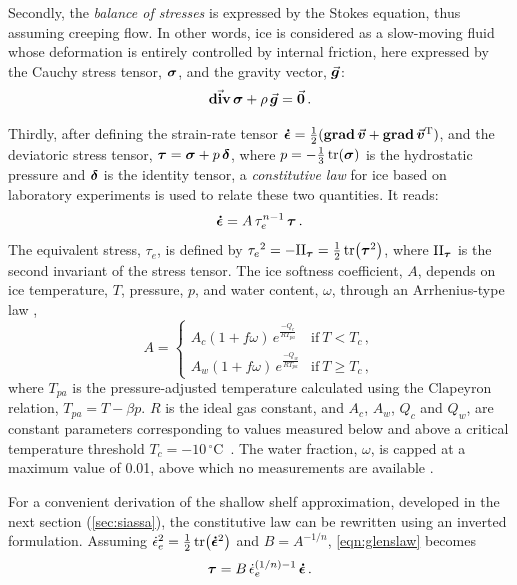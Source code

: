 \documentclass[a4paper]{kappa}
\newcommand{\vect}[1]{\va*{#1}} %
\newcommand{\tens}[1]{\vb*{#1}} %
\newcommand{\tdiv}[1]{\vect{\mathrm{div}}\,#1}      %
\newcommand{\tgrad}[1]{\tens{\mathrm{grad}}\,#1}    %
\newcommand{\doteps}[0]{\dot{\epsilon}} %
\newcommand{\IDT}[0]{\tens{\delta}}     %
\newcommand{\CST}[0]{\tens{\sigma}}     %
\newcommand{\DST}[0]{\tens{\tau}}       %
\newcommand{\SRT}[0]{\tens{\doteps}}    %
\newcommand{\vv}[0]{\vect{v}}           %
\newcommand{\unit}[1]{\ensuremath{\mathrm{#1}}}
\newcommand{\degree}[0]{\ensuremath{^{\circ}}}
\newcommand{\degC}[0]{\unit{{\degree}C}}
\begin{document}
Secondly, the \emph{balance of stresses} is expressed by the Stokes equation,
thus assuming creeping flow. In other words, ice is considered as a slow-moving
fluid whose deformation is entirely controlled by internal friction, here
expressed by the Cauchy stress tensor, $\CST$, and the gravity vector,
$\vect{g}$:
\begin{equation}
    \label{eqn:stressbalance}
    \tdiv{\CST} + \rho\,\vect{g} = \vect{0} \,.
\end{equation}

Thirdly, after defining the strain-rate tensor
${\SRT = \frac{1}{2}(\tgrad{\vv} + \tgrad{\vv}^{\mathrm{T}})}$,
and the deviatoric stress tensor, ${\DST = \CST + p\,\IDT}$,
where $p=-\frac{1}{3}\tr(\CST)$ is the hydrostatic pressure and
$\tens{\delta}$ is the identity tensor, a \emph{constitutive law} for ice
\citep{Nye.1953} based on laboratory experiments \citep{Glen.1952} is used to
relate these two quantities. It reads:
\begin{equation}
    \label{eqn:glenslaw}
    \SRT = A\,\tau_e^{n-1}\,\DST \,.
\end{equation}
The equivalent stress, $\tau_e$, is defined by
${\tau_e}^2 = -\mathrm{II}_{\DST} = \frac{1}{2} \tr(\DST^2)$,
where $\mathrm{II}_{\DST}$ is the second invariant of the stress tensor.
The ice softness coefficient, $A$, depends on ice temperature, $T$, pressure, $p$, and
water content, $\omega$, through an Arrhenius-type law
\citep[Eqs.~63--65]{Paterson.Budd.1982, Aschwanden.etal.2012},
\begin{equation}
    A =
    \begin{cases}
        A_c (1+f\omega)\,e^\frac{-Q_c}{RT_{pa}}
            & \text{if}\ T < T_c \,, \\
        A_w (1+f\omega)\,e^\frac{-Q_w}{RT_{pa}}
            & \text{if}\ T \ge T_c \,,
    \end{cases}
\end{equation}
where $T_{pa}$ is the pressure-adjusted temperature calculated using the
Clapeyron relation, ${T_{pa} = T - \beta p}$. $R$ is the ideal gas constant,
and $A_c$, $A_w$, $Q_c$ and $Q_w$, are constant parameters corresponding to
values measured below and above a critical temperature threshold
${T_c=-10}$\,\degC\ \citep[\cref{tab:params};][]{Paterson.Budd.1982}.
The water fraction, $\omega$, is capped at a maximum value of 0.01, above which
no measurements are available \citep[Eq.~5.7]{Lliboutry.Duval.1985,
Greve.1997}.

For a convenient derivation of the shallow shelf approximation, developed in
the next section (\cref{sec:siassa}), the constitutive law can be rewritten
using an inverted formulation. Assuming
${{\doteps_e}^2 = \frac{1}{2} \tr(\SRT^2)}$ and ${B=A^{-1/n}}$,
\cref{eqn:glenslaw} becomes
\begin{equation}
    \label{eqn:invglenslaw}
    \DST = B\,\doteps_e^{(1/n)-1}\,\SRT \,.
\end{equation}
\end{document}
